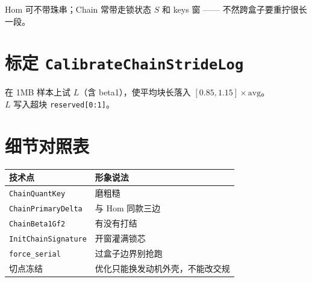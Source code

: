 Hom 可不带珠串；Chain 常带走锁状态 $S$ 和 keys 窗 —— 不然跨盒子要重拧很长一段。

\section{标定 \texttt{CalibrateChainStrideLog}}

在 1MB 样本上试 $L$（含 beta1），使平均块长落入 $[0.85,1.15]\times\mathrm{avg}$。\\
$L$ 写入超块 \texttt{reserved[0:1]}。

\section{细节对照表}

\begin{center}
\small
\begin{tabular}{@{}lp{7.2cm}@{}}
\toprule
技术点 & 形象说法 \\
\midrule
\texttt{ChainQuantKey} & 磨粗糙 \\
\texttt{ChainPrimaryDelta} & 与 Hom 同款三边 \\
\texttt{ChainBeta1Gf2} & 有没有打结 \\
\texttt{InitChainSignature} & 开窗灌满锁芯 \\
\texttt{force\_serial} & 过盒子边界别抢跑 \\
切点冻结 & 优化只能换发动机外壳，不能改交规 \\
\bottomrule
\end{tabular}
\end{center}
